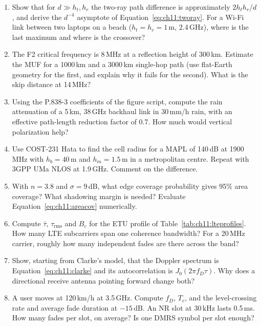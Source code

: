 \begin{enumerate}[label=\thechapter.\arabic*]
\begin{center}
\end{center}
\item Show that for $d\gg h_t,h_r$ the two-ray path difference is approximately $2h_th_r/d$, and derive
the $d^{-4}$ asymptote of Equation~\eqref{eq:ch11:tworay}. For a Wi-Fi link between two laptops on a
beach ($h_t=h_r=1$\,m, 2.4\,GHz), where is the last maximum and where is the crossover?
\item The F2 critical frequency is 8\,MHz at a reflection height of 300\,km. Estimate the MUF for
a 1000\,km and a 3000\,km single-hop path (use flat-Earth geometry for the first, and explain why it
fails for the second). What is the skip distance at 14\,MHz?
\item Using the P.838-3 coefficients of the figure script, compute the rain attenuation of a 5\,km, 38\,GHz
backhaul link in 30\,mm/h rain, with an effective path-length reduction factor of 0.7. How much would
vertical polarization help?
\item Use COST-231 Hata to find the cell radius for a MAPL of 140\,dB at 1900\,MHz with $h_b=40$\,m and
$h_m=1.5$\,m in a metropolitan centre. Repeat with 3GPP UMa NLOS at 1.9\,GHz. Comment on the
difference.
\item With $n=3.8$ and $\sigma=9$\,dB, what edge coverage probability gives 95\% area coverage? What
shadowing margin is needed? Evaluate Equation~\eqref{eq:ch11:areacov} numerically.
\item Compute $\bar\tau$, $\tau_{\text{rms}}$ and $B_c$ for the ETU profile of
Table~\ref{tab:ch11:lteprofiles}. How many LTE subcarriers span one coherence bandwidth? For a
20\,MHz carrier, roughly how many independent fades are there across the band?
\item Show, starting from Clarke's model, that the Doppler spectrum is Equation~\eqref{eq:ch11:clarke}
and its autocorrelation is $J_0(2\pi f_D\tau)$. Why does a directional receive antenna pointing
forward change both?
\item A user moves at 120\,km/h at 3.5\,GHz. Compute $f_D$, $T_c$, and the level-crossing rate and
average fade duration at $-15$\,dB. An NR slot at 30\,kHz lasts 0.5\,ms. How many fades per slot, on
average? Is one DMRS symbol per slot enough?
\begin{center}
\end{center}
\end{enumerate}
